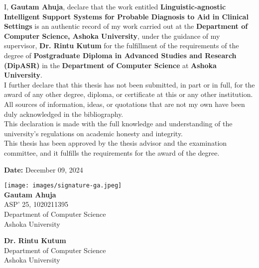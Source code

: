 I, \textbf{Gautam Ahuja}, declare that the work entitled \textbf{Linguistic-agnostic Intelligent Support Systems for Probable Diagnosis to Aid in Clinical Settings} is an authentic record of my work carried out at the \textbf{Department of Computer Science, Ashoka University}, under the guidance of my supervisor, \textbf{Dr. Rintu Kutum} for the fulfillment of the requirements of the degree of \textbf{Postgraduate Diploma in Advanced Studies and Research (DipASR)} in the \textbf{Department of Computer Science} at \textbf{Ashoka University}. \\%

\noindent I further declare that this thesis has not been submitted, in part or in full, for the award of any other degree, diploma, or certificate at this or any other institution. All sources of information, ideas, or quotations that are not my own have been duly acknowledged in the bibliography. \\ %


\noindent This declaration is made with the full knowledge and understanding of the university's regulations on academic honesty and integrity. \\%


\noindent This thesis has been approved by the thesis advisor and the examination committee, and it fulfills the requirements for the award of the degree.\\%

\begin{flushleft}
\textbf{Date:} December 09, 2024
\end{flushleft}

\begin{flushright}
\texttt{[image: images/signature-ga.jpeg]}\\
\textbf{Gautam Ahuja}\\
ASP' 25, 1020211395\\
Department of Computer Science\\
Ashoka University\\
\end{flushright}

\vspace{1cm}
\begin{flushright}
\textbf{Dr. Rintu Kutum}\\
Department of Computer Science\\
Ashoka University\\
\end{flushright}